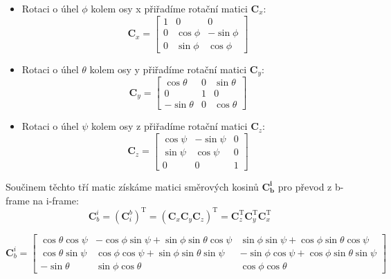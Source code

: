 \begin{itemize}
\item Rotaci o úhel $ \phi $ kolem osy x přiřadíme rotační matici $ \mathbf{C}_{x} $: \cite{Tittertonc2004}
\begin{equation}
\mathbf{C}_x=\left[\begin{array}{ccc}
1 & 0 & 0 \\
0 & \cos \phi & -\sin \phi \\
0 & \sin \phi & \cos \phi
\end{array}\right]
\end{equation}

\item Rotaci o úhel $ \theta $ kolem osy y přiřadíme rotační matici $ \mathbf{C}_{y} $: \cite{Tittertonc2004}
\begin{equation}
\mathbf{C}_y=\left[\begin{array}{ccc}
\cos \theta & 0 & \sin \theta \\
0 & 1 & 0 \\
-\sin \theta & 0 & \cos \theta
\end{array}\right]
\end{equation}

\item Rotaci o úhel $ \psi $ kolem osy z přiřadíme rotační matici $ \mathbf{C}_{z} $: \cite{Tittertonc2004}
\begin{equation}
\mathbf{C}_z=\left[\begin{array}{ccc}
\cos \psi & -\sin \psi & 0 \\
\sin \psi & \cos \psi & 0 \\
0 & 0 & 1
\end{array}\right]
\end{equation} 

\end{itemize}

Součinem těchto tří matic získáme matici směrových kosinů $ \mathbf{C_{b}^{i}} $ pro převod z b-frame na i-frame: \cite{Tittertonc2004}
\begin{equation}
\mathbf{C}_{b}^{i}= (\mathbf{C}_{i}^{b})^{\mathrm{T}} = (\mathbf{C}_{x}\mathbf{C}_{y}\mathbf{C}_{z})^{\mathrm{T}} = \mathbf{C}_{z}^{\mathrm{T}}\mathbf{C}_{y}^{\mathrm{T}}\mathbf{C}_{x}^{\mathrm{T}}
\end{equation}

\begin{equation}
\mathbf{C}_{b}^{i}=
\left[\begin{array}{ccc}
\cos \theta \cos \psi & -\cos \phi \sin \psi+\sin \phi \sin \theta \cos \psi & \sin \phi \sin \psi+\cos \phi \sin \theta \cos \psi \\
\cos \theta \sin \psi & \cos \phi \cos \psi+\sin \phi \sin \theta \sin \psi & -\sin \phi \cos \psi+\cos \phi \sin \theta \sin \psi \\
-\sin \theta & \sin \phi \cos \theta & \cos \phi \cos \theta
\end{array}\right]
\end{equation}

